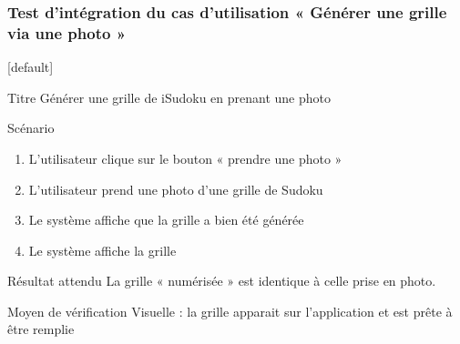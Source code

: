 \documentclass{beamer}
\begin{document}
\begin{frame}
  \frametitle{Test d’intégration  du cas d'utilisation « Générer une grille via une photo »}
  [default]
  \begin{block}{\footnotesize{Titre}}
    \scriptsize{Générer une grille de iSudoku en prenant une photo}
  \end{block}
  \pause
  \begin{block}{\footnotesize{Scénario}}
    \begin{enumerate}
      [circle]
      \item
        \scriptsize{L’utilisateur clique sur le bouton « prendre une photo »}
      \item
        \scriptsize{L’utilisateur prend une photo d’une grille de Sudoku}
      \item
        \scriptsize{Le système affiche que la grille a bien été générée}
      \item
        \scriptsize{Le système affiche la grille} 
    \end{enumerate}
  \end{block}
  \pause
  \begin{block}{\footnotesize{Résultat attendu}}
    \scriptsize{La grille « numérisée » est identique à celle prise en photo.}
  \end{block}
  \begin{block}{\footnotesize{Moyen de vérification}}
    \scriptsize{Visuelle : la grille apparait sur l’application et est prête à être remplie}
  \end{block}
\end{frame}
\end{document}
